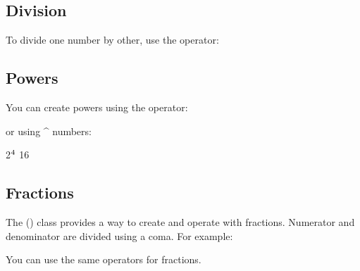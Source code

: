 \documentclass[letterpaper,10pt,english]{sphinxmanual}
\begin{document}
\subsection{Division}
\label{\detokenize{user_guide:division}}
To divide one number by other, use the \sphinxcode{\sphinxupquote{/}} operator:

\begin{sphinxVerbatim}[commandchars=\\\{\}]
   
\end{sphinxVerbatim}


\subsection{Powers}
\label{\detokenize{user_guide:powers}}
You can create powers using the \sphinxcode{\sphinxupquote{**}} operator:

\begin{sphinxVerbatim}[commandchars=\\\{\}]
   
\end{sphinxVerbatim}

or using \textasciicircum{} numbers:

\begin{sphinxVerbatim}[commandchars=\\\{\}]
\PYGZgt{} 2\(\sp{\text{4}}\)
16
\end{sphinxVerbatim}


\subsection{Fractions}
\label{\detokenize{user_guide:fractions}}
The  () class provides a way to create and operate with fractions.
Numerator and denominator are divided using a coma. For example:

\begin{sphinxVerbatim}[commandchars=\\\{\}]
   
\end{sphinxVerbatim}

You can use the same operators for fractions.
\end{document}
